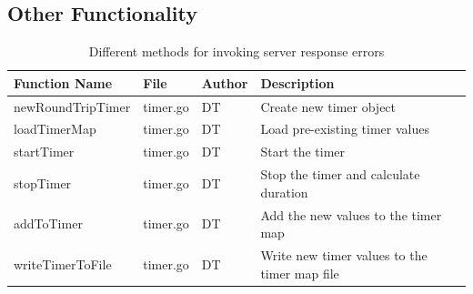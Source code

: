 \documentclass[10pt,twocolumn]{witseiepaper}
\begin{document}
		
		
		
		
	\subsection{Other Functionality}
	
		\begin{table}[htbp]
			\centering
			\caption{Different methods for invoking server response errors}
			\label{tab:functions}
			\begin{tabular}{p{}| p{} | p{} | p{}}
				\hline
				\textbf{Function Name} & \textbf{File} & \textbf{Author} & \textbf{Description} \\ \hline
				newRoundTripTimer & timer.go & DT & Create new timer object \\
				loadTimerMap & timer.go & DT & Load pre-existing timer values \\
				startTimer & timer.go & DT & Start the timer \\
				stopTimer & timer.go & DT & Stop the timer and calculate duration \\
				addToTimer & timer.go & DT & Add the new values to the timer map \\
				writeTimerToFile & timer.go & DT & Write new timer values to the timer map file \\
				\hline
			\end{tabular}
		\end{table}
		

\end{document}
